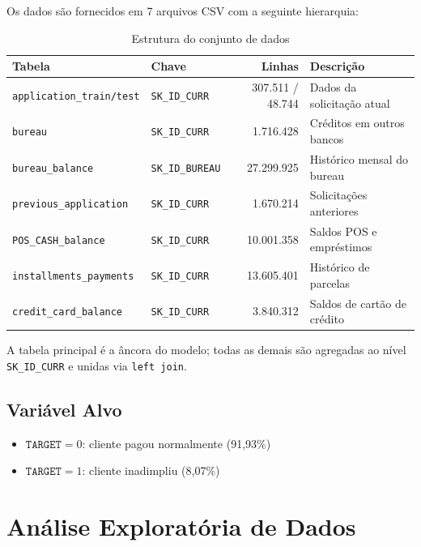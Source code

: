 \documentclass[12pt, a4paper]{article}
\begin{document}
Os dados s\~ao fornecidos em 7 arquivos CSV com a seguinte hierarquia:

\begin{table}[H]
\centering
\begin{tabular}{llrl}
\toprule
\textbf{Tabela} & \textbf{Chave} & \textbf{Linhas} & \textbf{Descri\c{c}\~ao} \\
\midrule
\texttt{application\_train/test} & \texttt{SK\_ID\_CURR} & 307.511 / 48.744 & Dados da solicita\c{c}\~ao atual \\
\texttt{bureau}                  & \texttt{SK\_ID\_CURR} & 1.716.428        & Cr\'editos em outros bancos \\
\texttt{bureau\_balance}         & \texttt{SK\_ID\_BUREAU}& 27.299.925      & Hist\'orico mensal do bureau \\
\texttt{previous\_application}   & \texttt{SK\_ID\_CURR} & 1.670.214        & Solicita\c{c}\~oes anteriores \\
\texttt{POS\_CASH\_balance}      & \texttt{SK\_ID\_CURR} & 10.001.358       & Saldos POS e empr\'estimos \\
\texttt{installments\_payments}  & \texttt{SK\_ID\_CURR} & 13.605.401       & Hist\'orico de parcelas \\
\texttt{credit\_card\_balance}   & \texttt{SK\_ID\_CURR} & 3.840.312        & Saldos de cart\~ao de cr\'edito \\
\bottomrule
\end{tabular}
\caption{Estrutura do conjunto de dados}
\end{table}

A tabela principal \'e a \^ancora do modelo; todas as demais s\~ao agregadas ao n\'ivel
\texttt{SK\_ID\_CURR} e unidas via \texttt{left join}.

\subsection{Vari\'avel Alvo}

\begin{itemize}
    \item $\texttt{TARGET} = 0$: cliente pagou normalmente (91,93\%)
    \item $\texttt{TARGET} = 1$: cliente inadimpliu (8,07\%)
\end{itemize}

\section{An\'alise Explorat\'oria de Dados}
\end{document}
